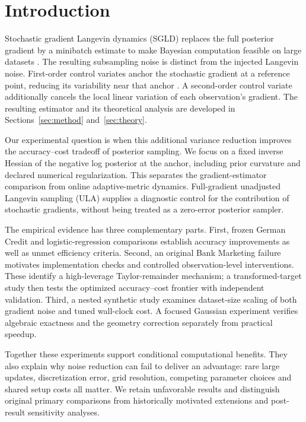 \section{Introduction}
Stochastic gradient Langevin dynamics (SGLD) replaces the full posterior gradient by a minibatch estimate to make Bayesian computation feasible on large datasets \citep{welling2011}. The resulting subsampling noise is distinct from the injected Langevin noise. First-order control variates anchor the stochastic gradient at a reference point, reducing its variability near that anchor \citep{baker2017}. A second-order control variate additionally cancels the local linear variation of each observation's gradient. The resulting estimator and its theoretical analysis are developed in Sections~\ref{sec:method} and~\ref{sec:theory}.

Our experimental question is when this additional variance reduction improves the accuracy--cost tradeoff of posterior sampling. We focus on a fixed inverse Hessian of the negative log posterior at the anchor, including prior curvature and declared numerical regularization. This separates the gradient-estimator comparison from online adaptive-metric dynamics. Full-gradient unadjusted Langevin sampling (ULA) supplies a diagnostic control for the contribution of stochastic gradients, without being treated as a zero-error posterior sampler.

The empirical evidence has three complementary parts. First, frozen German Credit and logistic-regression comparisons establish accuracy improvements as well as unmet efficiency criteria. Second, an original Bank Marketing failure motivates implementation checks and controlled observation-level interventions. These identify a high-leverage Taylor-remainder mechanism; a transformed-target study then tests the optimized accuracy--cost frontier with independent validation. Third, a nested synthetic study examines dataset-size scaling of both gradient noise and tuned wall-clock cost. A focused Gaussian experiment verifies algebraic exactness and the geometry correction separately from practical speedup.

Together these experiments support conditional computational benefits. They also explain why noise reduction can fail to deliver an advantage: rare large updates, discretization error, grid resolution, competing parameter choices and shared setup costs all matter. We retain unfavorable results and distinguish original primary comparisons from historically motivated extensions and post-result sensitivity analyses.

